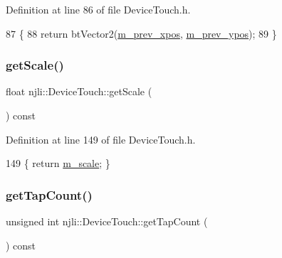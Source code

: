 Definition at line 86 of file Device\+Touch.\+h.


\begin{DoxyCode}
87     \{
88       \textcolor{keywordflow}{return} btVector2(\mbox{\hyperlink{classnjli_1_1_device_touch_aefd5c83cec6edc7dcb7edeec2144c470}{m\_prev\_xpos}}, \mbox{\hyperlink{classnjli_1_1_device_touch_adc6f1bce3fa81e81f1a01ca55b2b3db7}{m\_prev\_ypos}});
89     \}
\end{DoxyCode}
\mbox{\label{classnjli_1_1_device_touch_a9ae62b2e6e812acc5283a462788dbf81}} 
\subsubsection{\texorpdfstring{get\+Scale()}{getScale()}}
{\footnotesize\ttfamily float njli\+::\+Device\+Touch\+::get\+Scale (\begin{DoxyParamCaption}{ }\end{DoxyParamCaption}) const\hspace{0.3cm}{\ttfamily [inline]}}



Definition at line 149 of file Device\+Touch.\+h.


\begin{DoxyCode}
149 \{ \textcolor{keywordflow}{return} \mbox{\hyperlink{classnjli_1_1_device_touch_ae07cde00eac9eb6e816f261bdb0df9d4}{m\_scale}}; \}
\end{DoxyCode}
\mbox{\label{classnjli_1_1_device_touch_a621adf317a60ce54643b076dd80e9b13}} 
\subsubsection{\texorpdfstring{get\+Tap\+Count()}{getTapCount()}}
{\footnotesize\ttfamily unsigned int njli\+::\+Device\+Touch\+::get\+Tap\+Count (\begin{DoxyParamCaption}{ }\end{DoxyParamCaption}) const\hspace{0.3cm}{\ttfamily [inline]}}



